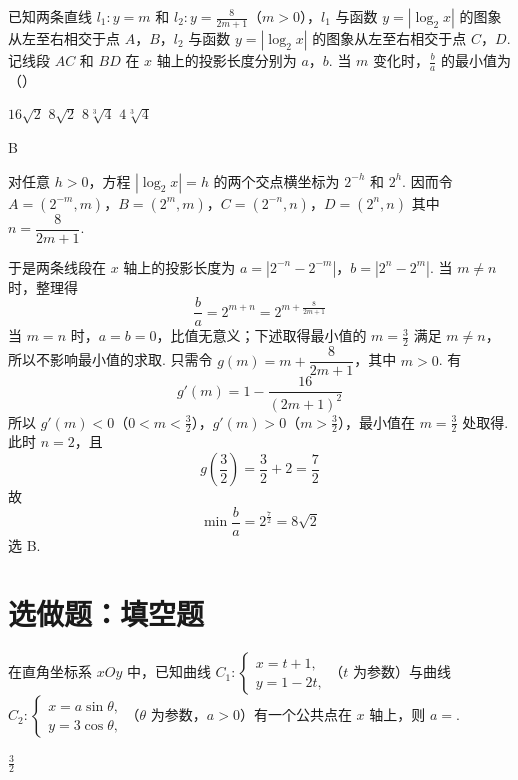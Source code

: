 \begin{problem}
已知两条直线 \(l_1:y=m\) 和 \(l_2:y=\frac{8}{2m+1}\)（\(m>0\)），\(l_1\) 与函数 \(y=|\log_2 x|\) 的图象从左至右相交于点 \(A\)，\(B\)，\(l_2\) 与函数 \(y=|\log_2 x|\) 的图象从左至右相交于点 \(C\)，\(D\). 记线段 \(AC\) 和 \(BD\) 在 \(x\) 轴上的投影长度分别为 \(a\)，\(b\). 当 \(m\) 变化时，\(\frac{b}{a}\) 的最小值为（\quad）

\choices
    {\(16\sqrt{2}\)}
    {\(8\sqrt{2}\)}
    {\(8\sqrt[3]{4}\)}
    {\(4\sqrt[3]{4}\)}
\end{problem}

\begin{answer}
B
\end{answer}

\begin{solution}
对任意 \(h>0\)，方程 \(|\log_2x|=h\) 的两个交点横坐标为 \(2^{-h}\) 和 \(2^h\). 因而令
\(A=(2^{-m},m)\)，\(B=(2^m,m)\)，\(C=(2^{-n},n)\)，\(D=(2^n,n)\)
其中 \(n=\dfrac{8}{2m+1}\).

于是两条线段在 \(x\) 轴上的投影长度为
\(a=|2^{-n}-2^{-m}|\)，\(b=|2^n-2^m|\).
当 \(m\neq n\) 时，整理得
\[
\frac ba=2^{m+n}=2^{m+\frac{8}{2m+1}}
\]
当 \(m=n\) 时，\(a=b=0\)，比值无意义；下述取得最小值的 \(m=\frac32\) 满足 \(m\neq n\)，所以不影响最小值的求取.
只需令 \(g(m)=m+\dfrac8{2m+1}\)，其中 \(m>0\). 有
\[
g'(m)=1-\frac{16}{(2m+1)^2}
\]
所以 \(g'(m)<0\)（\(0<m<\frac32\)），\(g'(m)>0\)（\(m>\frac32\)），最小值在 \(m=\frac32\) 处取得. 此时 \(n=2\)，且
\[
g\left(\frac32\right)=\frac32+2=\frac72
\]
故
\[
\min\frac ba=2^{\frac{7}{2}}=8\sqrt2
\]
选 B.
\end{solution}

\section{选做题：填空题}

\begin{problem}
在直角坐标系 \(xOy\) 中，已知曲线 \(C_1:\begin{cases}
x=t+1,\\
y=1-2t,
\end{cases}\)（\(t\) 为参数）与曲线 \(C_2:\begin{cases}
x=a\sin\theta,\\
y=3\cos\theta,
\end{cases}\)（\(\theta\) 为参数，\(a>0\)）有一个公共点在 \(x\) 轴上，则 \(a=\)\fillinblank{}.
\end{problem}

\begin{answer}
\(\frac{3}{2}\)
\end{answer}


